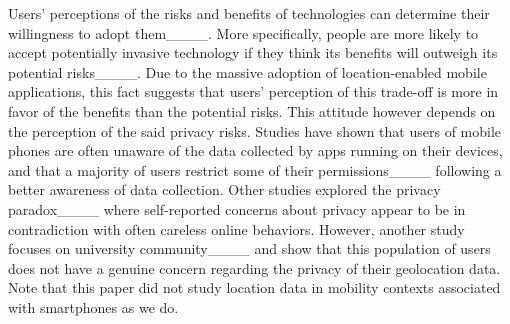 

Users' perceptions of the risks and benefits of technologies can determine their willingness to adopt them____. 
More specifically, people are more likely to accept potentially invasive technology if they think its benefits will outweigh its potential risks____.
Due to the massive adoption of location-enabled mobile applications, this fact suggests that users' perception of this trade-off is more in favor of the benefits than the potential risks.
This attitude however depends on the perception of the said privacy risks.
Studies have shown that users of mobile phones are often unaware of the data collected by apps running on their devices, and that a majority of users restrict some of their permissions____ following a better awareness of data collection.
Other studies explored the privacy paradox____ where self-reported concerns about privacy appear to be in contradiction with often careless online behaviors.
However, another study focuses on university community____ and show that this population of users does not have a genuine concern regarding the privacy of their geolocation data.
Note that this paper did not study location data in mobility contexts associated with smartphones as we do.




